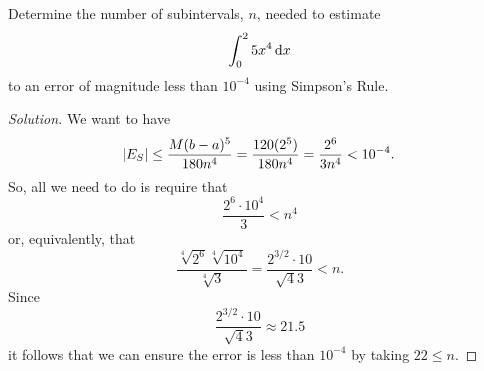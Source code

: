 \documentclass[reqno, 12pt]{amsart}
\begin{document}
\begin{example}
  Determine the number of subintervals, \(n\), needed to estimate
  \[\int_0^2 5x^4\dif x\]
  to an error of magnitude less than \(10^{-4}\) using Simpson's Rule.
\end{example}

\begin{proof}[Solution]
  We want to have
  \[\abs{E_S} \leq \frac{M(b-a)^5}{180n^4} = \frac{120(2^5)}{180n^4} = \frac{2^6}{3n^4}< 10^{-4}.\]
  So, all we need to do is require that
  \[\frac{2^6\cdot 10^4}{3} < n^4\]
  or, equivalently, that
  \[\frac{\sqrt[4]{2^6}\sqrt[4]{10^4}}{\sqrt[4]{3}} = \frac{2^{3/2}\cdot 10}{\sqrt{4}{3}} < n.\]
  Since
  \[\frac{2^{3/2}\cdot 10}{\sqrt{4}{3}} \approx 21.5\]
  it follows that we can ensure the error is less than \(10^{-4}\) by taking \(22 \leq n\).
\end{proof}
\end{document}

